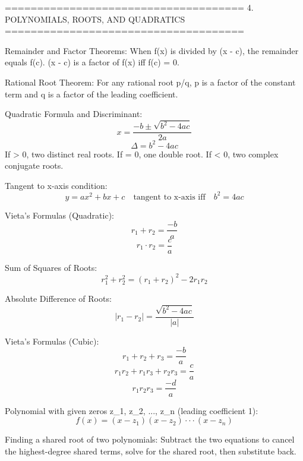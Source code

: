 =====================================
4. POLYNOMIALS, ROOTS, AND QUADRATICS
=====================================

Remainder and Factor Theorems:
When f(x) is divided by (x - c), the remainder equals f(c).
(x - c) is a factor of f(x) iff f(c) = 0.

Rational Root Theorem:
For any rational root p/q, p is a factor of the constant term and q is a factor of the leading coefficient.

Quadratic Formula and Discriminant:
$$x = \frac{-b \pm \sqrt{b^2 - 4ac}}{2a}$$
$$\Delta = b^2 - 4ac$$
If \Delta > 0, two distinct real roots.
If \Delta = 0, one double root.
If \Delta < 0, two complex conjugate roots.

Tangent to x-axis condition:
$$y = ax^2 + bx + c \quad \text{tangent to x-axis iff} \quad b^2 = 4ac$$

Vieta's Formulas (Quadratic):
$$r_1 + r_2 = \frac{-b}{a}$$
$$r_1 \cdot r_2 = \frac{c}{a}$$

Sum of Squares of Roots:
$$r_1^2 + r_2^2 = (r_1 + r_2)^2 - 2 r_1 r_2$$

Absolute Difference of Roots:
$$\left| r_1 - r_2 \right| = \frac{\sqrt{b^2 - 4ac}}{\left| a \right|}$$

Vieta's Formulas (Cubic):
$$r_1+r_2+r_3 = \frac{-b}{a}$$
$$r_1 r_2 + r_1 r_3 + r_2 r_3 = \frac{c}{a}$$
$$r_1 r_2 r_3 = \frac{-d}{a}$$

Polynomial with given zeros z_1, z_2, ..., z_n (leading coefficient 1):
$$f(x) = (x - z_1)(x - z_2) \cdot \cdot \cdot (x - z_n)$$

Finding a shared root of two polynomials:
Subtract the two equations to cancel the highest-degree shared terms, solve for the shared root, then substitute back.
